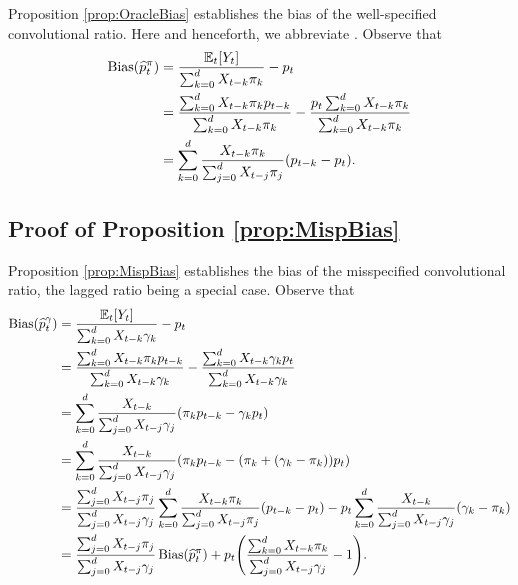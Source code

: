 \documentclass{article}
\renewcommand{\hat}{\widehat} %
\newcommand{\given}{\, \vert \,}
\DeclareMathOperator{\bias}{Bias}
\begin{document}
Proposition \eqref{prop:OracleBias} establishes the bias of the well-specified convolutional ratio.
Here and henceforth, we abbreviate \smash{$\E_t[\cdot] = \E[\cdot \given
  \{X_s\}_{s\leq t}]$}. Observe that
\begin{align*}
\bias(\hat{p}_t^\pi) 
&= \frac{\E_t[Y_t]}{\sum_{k=0}^d X_{t-k}\pi_k} - p_t \\ 
&= \frac{\sum_{k=0}^d X_{t-k}\pi_k p_{t-k}}{\sum_{k=0}^d X_{t-k}\pi_k} - 
\frac{p_t \sum_{k=0}^d X_{t-k}\pi_k}{\sum_{k=0}^d X_{t-k}\pi_k} \\
&= \sum_{k=0}^d \frac{X_{t-k}\pi_k}{\sum_{j=0}^d X_{t-j}\pi_j} (p_{t-k}-p_t).
\end{align*}


\subsection{Proof of Proposition \ref{prop:MispBias}}
\label{apx:MispBias}
Proposition \eqref{prop:MispBias} establishes the bias of the misspecified convolutional ratio, the lagged ratio being a special case.
Observe that
\begin{align*}
\bias(\hat{p}_t^\gamma) 
&= \frac{\E_t[Y_t]}{\sum_{k=0}^d X_{t-k}\gamma_k} - p_t \\
&= \frac{\sum_{k=0}^d X_{t-k}\pi_k p_{t-k}}{\sum_{k=0}^d X_{t-k}\gamma_k} -
\frac{\sum_{k=0}^d X_{t-k}\gamma_k p_t}{\sum_{k=0}^d X_{t-k}\gamma_k} \\
&= \sum_{k=0}^d \frac{X_{t-k}}{\sum_{j=0}^d X_{t-j}\gamma_j}
(\pi_k p_{t-k} - \gamma_k p_t) \\
&= \sum_{k=0}^d \frac{X_{t-k}}{\sum_{j=0}^d X_{t-j}\gamma_j}
(\pi_k p_{t-k}-(\pi_k +(\gamma_k-\pi_k)) p_t) \\
&= \frac{\sum_{j=0}^d X_{t-j}\pi_j}{\sum_{j=0}^d X_{t-j}\gamma_j}
\sum_{k=0}^d \frac{X_{t-k}\pi_k}{\sum_{j=0}^d X_{t-j}\pi_j}(p_{t-k}-p_t) -
p_t\sum_{k=0}^d \frac{X_{t-k}}{\sum_{j=0}^d X_{t-j}\gamma_j}(\gamma_k -\pi_k) \\ 
&= \frac{\sum_{j=0}^d X_{t-j}\pi_j}{\sum_{j=0}^d X_{t-j}\gamma_j} 
\bias(\hat{p}_t^\pi) + p_t\Bigg( \frac{\sum_{k=0}^d X_{t-k}\pi_k} 
{\sum_{j=0}^d X_{t-j}\gamma_j}-1\Bigg).
\end{align*}
\end{document}
